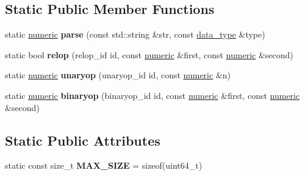 \subsection*{Static Public Member Functions}
\begin{DoxyCompactItemize}
\item 
\mbox{\label{classdialog_1_1numeric_ae65456d010e9b0578a6e32c1fba32a32}} 
static \hyperlink{classdialog_1_1numeric}{numeric} {\bfseries parse} (const std\+::string \&str, const \hyperlink{structdialog_1_1data__type}{data\+\_\+type} \&type)
\item 
\mbox{\label{classdialog_1_1numeric_ac321b6f6c17a58f9c8ef4263cc4dbeab}} 
static bool {\bfseries relop} (relop\+\_\+id id, const \hyperlink{classdialog_1_1numeric}{numeric} \&first, const \hyperlink{classdialog_1_1numeric}{numeric} \&second)
\item 
\mbox{\label{classdialog_1_1numeric_acad6c4821d99855d291551e35343ec82}} 
static \hyperlink{classdialog_1_1numeric}{numeric} {\bfseries unaryop} (unaryop\+\_\+id id, const \hyperlink{classdialog_1_1numeric}{numeric} \&n)
\item 
\mbox{\label{classdialog_1_1numeric_a2b0ff82a9cf146dec16f16058be3e463}} 
static \hyperlink{classdialog_1_1numeric}{numeric} {\bfseries binaryop} (binaryop\+\_\+id id, const \hyperlink{classdialog_1_1numeric}{numeric} \&first, const \hyperlink{classdialog_1_1numeric}{numeric} \&second)
\end{DoxyCompactItemize}
\subsection*{Static Public Attributes}
\begin{DoxyCompactItemize}
\item 
\mbox{\label{classdialog_1_1numeric_aa870fb295684672f1dba5be2abd09a5e}} 
static const size\+\_\+t {\bfseries M\+A\+X\+\_\+\+S\+I\+ZE} = sizeof(uint64\+\_\+t)
\end{DoxyCompactItemize}
